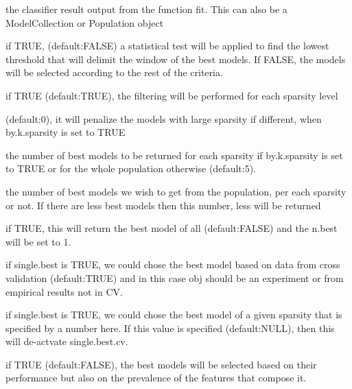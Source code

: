 \documentclass[a4paper]{book}
\begin{document}
\begin{Arguments}
\begin{ldescription}
\item[\code{obj:}] the classifier result output from the function fit. This can also be a ModelCollection or Population object

\item[\code{significance:}] if TRUE, (default:FALSE) a statistical test will be applied to find the lowest threshold that will delimit the window
of the best models. If FALSE, the models will be selected according to the rest of the criteria.

\item[\code{by.k.sparsity:}] if TRUE (default:TRUE), the filtering will be performed for each sparsity level

\item[\code{k.penalty:}] (default:0), it will penalize the models with large sparsity if different, when by.k.sparsity is set to TRUE

\item[\code{n.best:}] the number of best models to be returned for each sparsity if by.k.sparsity is set to TRUE or for the whole population 
otherwise (default:5).

\item[\code{nbest:}] the number of best models we wish to get from the population, per each sparsity or not. If there are less best models then this
number, less will be returned

\item[\code{single.best:}] if TRUE, this will return the best model of all (default:FALSE) and the n.best will be set to 1.

\item[\code{single.best.cv:}] if single.best is TRUE, we could chose the best model based on data from cross validation (default:TRUE) and in this 
case obj should be an experiment or from empirical results not in CV.

\item[\code{single.best.k:}] if single.best is TRUE, we could chose the best model of a given sparsity that is specified by a number here. 
If this value is specified (default:NULL), then this will de-actvate single.best.cv.

\item[\code{max.min.prevalence:}] if TRUE (default:FALSE), the best models will be selected based on their performance but also on the prevalence of 
the features that compose it.


\end{ldescription}
\end{Arguments}
\end{document}
